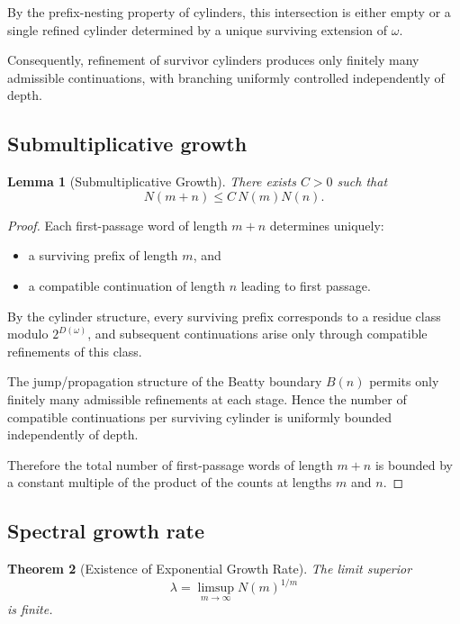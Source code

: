 \documentclass[12pt, oneside]{article}
\numberwithin{equation}{section}
\theoremstyle{definition}
\theoremstyle{plain}
\newtheorem{theorem}{Theorem}[section]
\newtheorem{lemma}[theorem]{Lemma}
\theoremstyle{remark}
\begin{document}
By the prefix-nesting property of cylinders, this intersection is
either empty or a single refined cylinder determined by a unique
surviving extension of \(\omega\).

Consequently, refinement of survivor cylinders produces only finitely
many admissible continuations, with branching uniformly controlled
independently of depth.

\subsection{Submultiplicative growth}

\begin{lemma}[Submultiplicative Growth]
There exists \(C>0\) such that
\[
N(m+n)\le C\,N(m)N(n).
\]
\end{lemma}

\begin{proof}
Each first-passage word of length \(m+n\) determines uniquely:
\begin{itemize}
\item a surviving prefix of length \(m\), and
\item a compatible continuation of length \(n\) leading to first passage.
\end{itemize}

By the cylinder structure, every surviving prefix corresponds to a
residue class modulo \(2^{D(\omega)}\), and subsequent continuations
arise only through compatible refinements of this class.

The jump/propagation structure of the Beatty boundary \(B(n)\)
permits only finitely many admissible refinements at each stage.
Hence the number of compatible continuations per surviving cylinder
is uniformly bounded independently of depth.

Therefore the total number of first-passage words of length \(m+n\)
is bounded by a constant multiple of the product of the counts at
lengths \(m\) and \(n\).
\end{proof}

\subsection{Spectral growth rate}

\begin{theorem}[Existence of Exponential Growth Rate]
The limit superior
\[
\lambda
=
\limsup_{m\to\infty} N(m)^{1/m}
\]
is finite.
\end{theorem}
\end{document}
